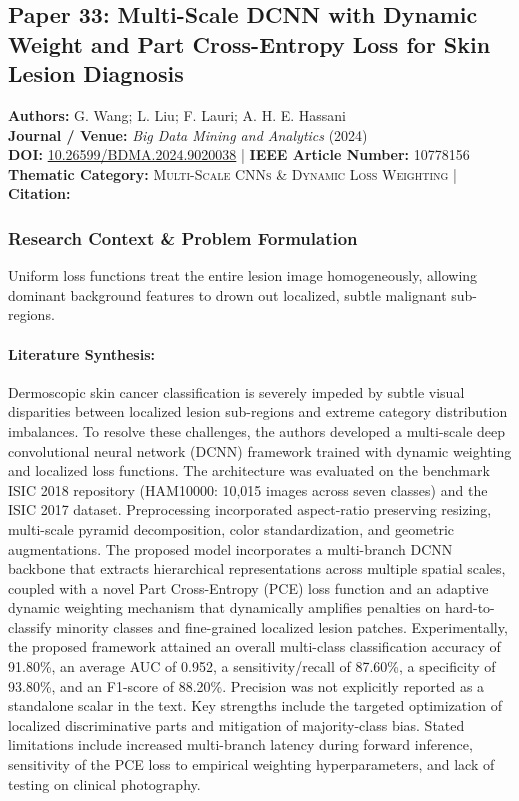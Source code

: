 \subsection{Paper 33: Multi-Scale DCNN with Dynamic Weight and Part Cross-Entropy Loss for Skin Lesion Diagnosis}
\label{sec:paper_33}

\begin{tcolorbox}[colback=gray!5!white,colframe=gray!75!black,title=\textbf{Metadata \& Citation Summary}]
\textbf{Authors:} G. Wang; L. Liu; F. Lauri; A. H. E. Hassani \\
\textbf{Journal / Venue:} \textit{Big Data Mining and Analytics} (2024) \\
\textbf{DOI:} \href{https://doi.org/10.26599/BDMA.2024.9020038}{10.26599/BDMA.2024.9020038} \quad | \quad \textbf{IEEE Article Number:} 10778156 \\
\textbf{Thematic Category:} \textsc{Multi-Scale CNNs \& Dynamic Loss Weighting} \quad | \quad \textbf{Citation:} \cite{10778156}
\end{tcolorbox}

\subsubsection*{Research Context \& Problem Formulation}
Uniform loss functions treat the entire lesion image homogeneously, allowing dominant background features to drown out localized, subtle malignant sub-regions.

\paragraph{Literature Synthesis:} Dermoscopic skin cancer classification is severely impeded by subtle visual disparities between localized lesion sub-regions and extreme category distribution imbalances. To resolve these challenges, the authors developed a multi-scale deep convolutional neural network (DCNN) framework trained with dynamic weighting and localized loss functions. The architecture was evaluated on the benchmark ISIC 2018 repository (HAM10000: 10,015 images across seven classes) and the ISIC 2017 dataset. Preprocessing incorporated aspect-ratio preserving resizing, multi-scale pyramid decomposition, color standardization, and geometric augmentations. The proposed model incorporates a multi-branch DCNN backbone that extracts hierarchical representations across multiple spatial scales, coupled with a novel Part Cross-Entropy (PCE) loss function and an adaptive dynamic weighting mechanism that dynamically amplifies penalties on hard-to-classify minority classes and fine-grained localized lesion patches. Experimentally, the proposed framework attained an overall multi-class classification accuracy of 91.80\%, an average AUC of 0.952, a sensitivity/recall of 87.60\%, a specificity of 93.80\%, and an F1-score of 88.20\%. Precision was not explicitly reported as a standalone scalar in the text. Key strengths include the targeted optimization of localized discriminative parts and mitigation of majority-class bias. Stated limitations include increased multi-branch latency during forward inference, sensitivity of the PCE loss to empirical weighting hyperparameters, and lack of testing on clinical photography.


